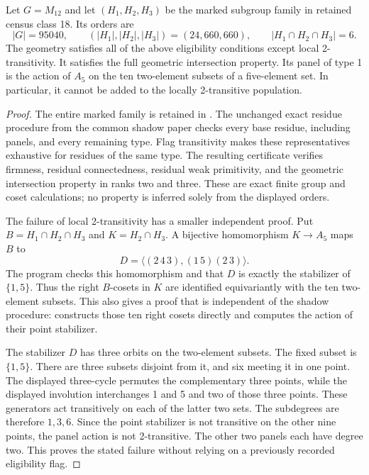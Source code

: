 \begin{proposition}
Let $G=M_{12}$ and let $(H_1,H_2,H_3)$ be the marked subgroup family
in retained census class 18. Its orders are
\[
 |G|=95040,\qquad (|H_1|,|H_2|,|H_3|)=(24,660,660),
 \qquad |H_1\cap H_2\cap H_3|=6.
\]
The geometry satisfies all of the above eligibility conditions except
local 2-transitivity. It satisfies the full geometric intersection
property. Its panel of type 1 is the action of $A_5$ on the ten
two-element subsets of a five-element set. In particular, it cannot
be added to the locally 2-transitive population.
\end{proposition}
\begin{proof}
The entire marked family is retained in
. The unchanged exact residue procedure
from the common shadow paper checks every base residue, including
panels, and every remaining type. Flag transitivity makes these
representatives exhaustive for residues of the same type. The resulting
certificate verifies firmness, residual connectedness, residual weak
primitivity, and the geometric intersection property in ranks two and
three. These are exact finite group and coset calculations; no property
is inferred solely from the displayed orders.

The failure of local 2-transitivity has a smaller independent proof.
Put $B=H_1\cap H_2\cap H_3$ and $K=H_2\cap H_3$. A bijective
homomorphism $K\longrightarrow A_5$ maps $B$ to
\[
 D=\langle(2\,4\,3),(1\,5)(2\,3)\rangle.
\]
The program  checks this homomorphism and
that $D$ is exactly the stabilizer of $\{1,5\}$. Thus the right
$B$-cosets in $K$ are identified equivariantly with the ten two-element
subsets. This also gives a proof that is independent of the shadow
procedure:  constructs those ten right cosets directly
and computes the action of their point stabilizer.

The stabilizer $D$ has three orbits on the two-element subsets. The
fixed subset is $\{1,5\}$. There are three subsets disjoint from it,
and six meeting it in one point. The displayed three-cycle permutes
the complementary three points, while the displayed involution
interchanges 1 and 5 and two of those three points. These generators
act transitively on each of the latter two sets. The subdegrees are
therefore $1,3,6$. Since the point stabilizer is not transitive on
the other nine points, the panel action is not 2-transitive. The
other two panels each have degree two. This proves the stated
failure without relying on a previously recorded eligibility flag.
\end{proof}

